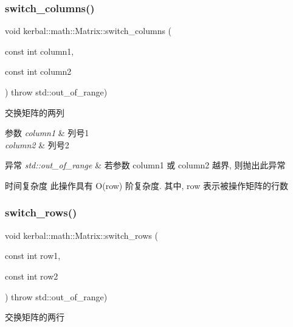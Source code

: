 \subsubsection{\texorpdfstring{switch\+\_\+columns()}{switch\_columns()}}
{\footnotesize\ttfamily void kerbal\+::math\+::\+Matrix\+::switch\+\_\+columns (\begin{DoxyParamCaption}\item[{const int}]{column1,  }\item[{const int}]{column2 }\end{DoxyParamCaption}) throw  std\+::out\+\_\+of\+\_\+range) }



交换矩阵的两列 


\begin{DoxyParams}{参数}
{\em column1} & 列号1 \\
\hline
{\em column2} & 列号2 \\
\hline
\end{DoxyParams}

\begin{DoxyExceptions}{异常}
{\em std\+::out\+\_\+of\+\_\+range} & 若参数 column1 或 column2 越界, 则抛出此异常 \\
\hline
\end{DoxyExceptions}
\begin{DoxyParagraph}{时间复杂度}
此操作具有 O(row) 阶复杂度. 其中, row 表示被操作矩阵的行数 
\end{DoxyParagraph}
\mbox{\label{classkerbal_1_1math_1_1_matrix_a07d1c06f2a123d7a7366c49c8c884f03}} 
\subsubsection{\texorpdfstring{switch\+\_\+rows()}{switch\_rows()}}
{\footnotesize\ttfamily void kerbal\+::math\+::\+Matrix\+::switch\+\_\+rows (\begin{DoxyParamCaption}\item[{const int}]{row1,  }\item[{const int}]{row2 }\end{DoxyParamCaption}) throw  std\+::out\+\_\+of\+\_\+range) }



交换矩阵的两行 


